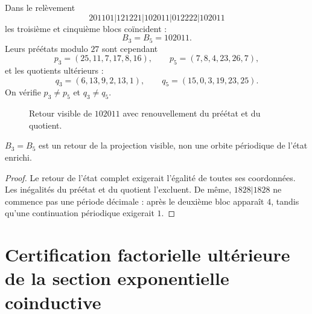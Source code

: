 Dans le relèvement
\[
 201101|121221|102011|012222|102011
\]
les troisième et cinquième blocs coïncident :
\[
 B_3=B_5=102011.
\]
Leurs préétats modulo \(27\) sont cependant
\[
 p_3=(25,11,7,17,8,16),
 \qquad
 p_5=(7,8,4,23,26,7),
\]
et les quotients ultérieurs :
\[
 q_3=(6,13,9,2,13,1),
 \qquad
 q_5=(15,0,3,19,23,25).
\]
On vérifie \(p_3\ne p_5\) et \(q_3\ne q_5\).

\begin{figure}[htbp]
\centering
{}
\caption{Retour visible de \(102011\) avec renouvellement du préétat et du
quotient.}
\label{gfp:b:fig:ruptura-memoria-e}
\end{figure}

\begin{theorem}
\label{gfp:b:thm:retorno-visible-no-periodico-e}
\(B_3=B_5\) est un retour de la projection visible, non une orbite périodique
de l’état enrichi.
\end{theorem}

\begin{proof}
Le retour de l’état complet exigerait l’égalité de toutes ses coordonnées.
Les inégalités du préétat et du quotient l’excluent. De même,
\(1828|1828\) ne commence pas une période décimale : après le deuxième bloc apparaît
\(4\), tandis qu’une continuation périodique exigerait \(1\).
\end{proof}

\section{Certification factorielle ultérieure de la section exponentielle coinductive}


